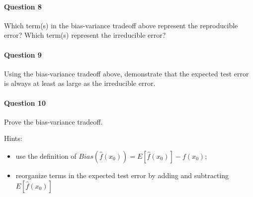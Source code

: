 \documentclass[
]{article}
\providecommand{\tightlist}{%
  \setlength{\itemsep}{0pt}\setlength{\parskip}{0pt}}
\begin{document}
\hypertarget{question-8}{%
\paragraph{Question 8}\label{question-8}}

Which term(s) in the bias-variance tradeoff above represent the
reproducible error? Which term(s) represent the irreducible error?

\hypertarget{question-9}{%
\paragraph{Question 9}\label{question-9}}

Using the bias-variance tradeoff above, demonstrate that the expected
test error is always at least as large as the irreducible error.

\hypertarget{question-10}{%
\paragraph{Question 10}\label{question-10}}

Prove the bias-variance tradeoff.

Hints:

\begin{itemize}
\tightlist
\item
  use the definition of \(Bias(\hat{f}(x_0))=E[\hat{f}(x_0)]-f(x_0)\);
\item
  reorganize terms in the expected test error by adding and subtracting
  \(E[\hat{f}(x_0)]\)
\end{itemize}
\end{document}
